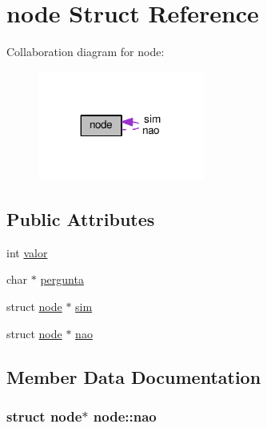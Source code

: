 \hypertarget{structnode}{}\section{node Struct Reference}
\label{structnode}


Collaboration diagram for node\+:\nopagebreak
\begin{figure}[H]
\begin{center}
\leavevmode
\includegraphics[width=155pt]{structnode__coll__graph}
\end{center}
\end{figure}
\subsection*{Public Attributes}
\begin{DoxyCompactItemize}
\item 
int \hyperlink{structnode_aae328428a1fb362e7e7aca4b3ad67470}{valor}
\item 
char $\ast$ \hyperlink{structnode_a55a6556b4365a179d03ca038fad7530c}{pergunta}
\item 
struct \hyperlink{structnode}{node} $\ast$ \hyperlink{structnode_a7f67cb5c3c6ed869d7e9a204af095135}{sim}
\item 
struct \hyperlink{structnode}{node} $\ast$ \hyperlink{structnode_a295980223d27becf8725335bbd5d1c61}{nao}
\end{DoxyCompactItemize}


\subsection{Member Data Documentation}
\subsubsection[{\texorpdfstring{nao}{nao}}]{\setlength{\rightskip}{0pt plus 5cm}struct {\bf node}$\ast$ node\+::nao}\hypertarget{structnode_a295980223d27becf8725335bbd5d1c61}{}\label{structnode_a295980223d27becf8725335bbd5d1c61}
